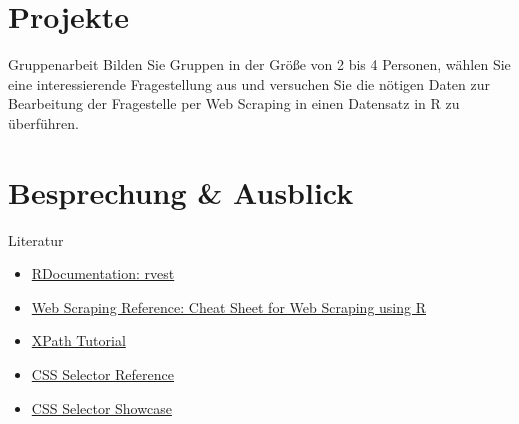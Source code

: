 \documentclass[xcolor=dvipsnames]{beamer}\usepackage[]{graphicx}\usepackage[]{color}
\begin{document}
\section{Projekte} %

\begin{frame}{Gruppenarbeit}
Bilden Sie Gruppen in der Größe von 2 bis 4 Personen, wählen Sie eine interessierende Fragestellung aus und versuchen Sie die nötigen Daten zur Bearbeitung der Fragestelle per Web Scraping in einen Datensatz in R zu überführen.
\end{frame}




\section{Besprechung \& Ausblick} %


\begin{frame}{Literatur}
  \begin{itemize}
    \item \href{https://www.rdocumentation.org/packages/rvest/versions/0.3.6}{RDocumentation: rvest}
    \item \href{https://github.com/yusuzech/r-web-scraping-cheat-sheet}{Web Scraping Reference: Cheat Sheet for Web Scraping using R}
    \item \href{https://www.w3schools.com/xml/xpath_intro.asp}{XPath Tutorial}
    \item \href{https://www.w3schools.com/cssref/css_selectors.asp}{CSS Selector Reference}
    \item \href{https://www.w3schools.com/cssref/trysel.asp}{CSS Selector Showcase}
  \end{itemize}
\end{frame}  
  

\begin{frame}

  
\end{frame} 
\end{document}
